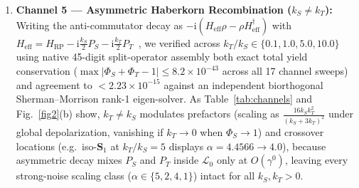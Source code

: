 \documentclass[twocolumn,10pt,amsmath,amssymb,floatfix]{revtex4-2}
\theoremstyle{plain}
\theoremstyle{definition}
\newcommand{\ii}{\mathrm{i}}
\newcommand{\PS}{P_S}
\newcommand{\PT}{P_T}
\newcommand{\HRP}{H_{\mathrm{RP}}}
\begin{document}
\begin{enumerate}[leftmargin=1.4em,itemsep=2pt]
\item \textbf{Channel 5 --- Asymmetric Haberkorn Recombination ($k_S \neq k_T$):} Writing the anti-commutator decay as $-\ii(H_{\mathrm{eff}}\rho - \rho H_{\mathrm{eff}}^\dagger)$ with $H_{\mathrm{eff}} = \HRP - \ii\frac{k_S}{2}\PS - \ii\frac{k_T}{2}\PT$~\cite{Haberkorn1976MolPhys,Fay2018JCP}, we verified across $k_T/k_S \in \{0.1, 1.0, 5.0, 10.0\}$ using native 45-digit split-operator assembly both exact total yield conservation ($\max|\Phi_S+\Phi_T-1| \le 8.2\times 10^{-43}$ across all 17 channel sweeps) and agreement to $< 2.23\times 10^{-15}$ against an independent biorthogonal Sherman--Morrison rank-1 eigen-solver. As Table~\ref{tab:channels} and Fig.~\ref{fig2}(b) show, $k_T \neq k_S$ modulates prefactors (scaling as $\frac{16 k_S k_T^2}{(k_S+3k_T)^2}$ under global depolarization, vanishing if $k_T \to 0$ when $\Phi_S \to 1$) and crossover locations (e.g.\ iso-$\mathbf{S}_1$ at $k_T/k_S=5$ displays $\alpha = 4.4566 \to 4.0$), because asymmetric decay mixes $\PS$ and $\PT$ inside $\mathcal{L}_0$ only at $O(\gamma^0)$, leaving every strong-noise scaling class ($\alpha \in \{5, 2, 4, 1\}$) intact for all $k_S, k_T > 0$.
\end{enumerate}
\end{document}
